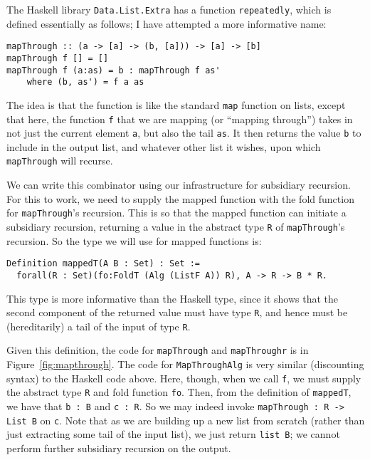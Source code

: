 \documentclass[a4paper,USenglish]{lipics-v2021}
\begin{document}
The Haskell library \verb|Data.List.Extra| has a function \verb|repeatedly|, which
is defined essentially as follows; I have attempted a more informative name:
\begin{verbatim}
mapThrough :: (a -> [a] -> (b, [a])) -> [a] -> [b]
mapThrough f [] = []
mapThrough f (a:as) = b : mapThrough f as'
    where (b, as') = f a as
\end{verbatim}
\noindent The idea is that the function is like the standard \verb|map| function
on lists, except that here, the function \verb|f| that we are mapping (or ``mapping
through'') takes in not just the current element \verb|a|, but also the tail \verb|as|.
It then returns the value \verb|b| to include in the output list, and whatever other
list it wishes, upon which \verb|mapThrough| will recurse.

We can write this combinator using our infrastructure for subsidiary recursion.
For this to work, we need to supply the mapped function with the fold function
for \verb|mapThrough|'s recursion.  This is so that the mapped function can
initiate a subsidiary recursion, returning a value in the abstract type \verb|R|
of \verb|mapThrough|'s recursion.  So the type we will use for mapped functions
is:
\begin{verbatim}
Definition mappedT(A B : Set) : Set :=
  forall(R : Set)(fo:FoldT (Alg (ListF A)) R), A -> R -> B * R.
\end{verbatim}
\noindent This type is more informative than the Haskell type,
since it shows that the second component of the returned value
must have type \verb|R|, and hence must be (hereditarily) a tail
of the input of type \verb|R|.

Given this definition, the code for \verb|mapThrough| and
\verb|mapThroughr| is in Figure~\ref{fig:mapthrough}.  The code for
\verb|MapThroughAlg| is very similar (discounting syntax) to the
Haskell code above.  Here, though, when we call \verb|f|, we must
supply the abstract type \verb|R| and fold function \verb|fo|.  Then,
from the definition of \verb|mappedT|, we have that \verb|b : B| and
\verb|c : R|.  So we may indeed invoke \verb|mapThrough : R -> List B|
on \verb|c|.  Note that as we are building up a new list from scratch
(rather than just extracting some tail of the input list), we just
return \verb|list B|; we cannot perform further subsidiary recursion
on the output.  
\end{document}
